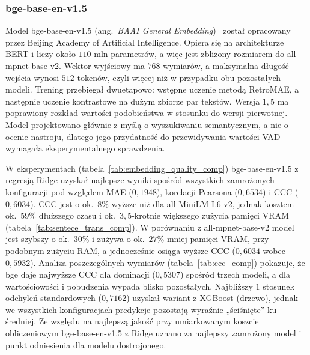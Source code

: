 \subsubsection{bge-base-en-v1.5}
\label{sec:bge_base}
Model bge-base-en-v1.5 (ang.\ \textit{BAAI General Embedding})~\cite{xiao2023cpack}
został opracowany przez Beijing Academy of Artificial Intelligence. Opiera się
na architekturze BERT i liczy około $110$ mln parametrów, a więc jest zbliżony
rozmiarem do all-mpnet-base-v2. Wektor wyjściowy ma $768$ wymiarów, a maksymalna
długość wejścia wynosi $512$ tokenów, czyli więcej niż w przypadku obu
pozostałych modeli. Trening przebiegał dwuetapowo: wstępne uczenie metodą
RetroMAE, a następnie uczenie kontrastowe na dużym zbiorze par tekstów.
Wersja $1{,}5$ ma poprawiony rozkład wartości podobieństwa w stosunku do
wersji pierwotnej. Model projektowano głównie z myślą o wyszukiwaniu
semantycznym, a nie o ocenie nastroju, dlatego jego przydatność do
przewidywania wartości VAD wymagała eksperymentalnego sprawdzenia.

W eksperymentach (tabela~\ref{tab:embedding_quality_comp}) bge-base-en-v1.5
z regresją Ridge uzyskał najlepsze wyniki spośród wszystkich zamrożonych
konfiguracji pod względem MAE ($0{,}1948$), korelacji Pearsona ($0{,}6534$)
i CCC ($0{,}6034$). CCC jest o ok.\ $8\%$ wyższe niż dla all-MiniLM-L6-v2,
jednak kosztem ok.\ $59\%$ dłuższego czasu i ok.\ $3{,}5$-krotnie większego
zużycia pamięci VRAM (tabela~\ref{tab:sentece_trans_comp}). W porównaniu
z all-mpnet-base-v2 model jest szybszy o ok.\ $30\%$ i zużywa o ok.\ $27\%$
mniej pamięci VRAM, przy podobnym zużyciu RAM, a jednocześnie osiąga wyższe
CCC ($0{,}6034$ wobec $0{,}5932$). Analiza poszczególnych wymiarów
(tabela~\ref{tab:ccc_comp}) pokazuje, że bge daje najwyższe CCC dla dominacji
($0{,}5307$) spośród trzech modeli, a dla wartościowości i pobudzenia wypada
blisko pozostałych. Najbliższy $1$ stosunek odchyleń standardowych
($0{,}7162$) uzyskał wariant z XGBoost (drzewo), jednak we wszystkich
konfiguracjach predykcje pozostają wyraźnie „ściśnięte” ku średniej.
Ze względu na najlepszą jakość przy umiarkowanym koszcie obliczeniowym
bge-base-en-v1.5 z Ridge uznano za najlepszy zamrożony model i punkt
odniesienia dla modelu dostrojonego.

